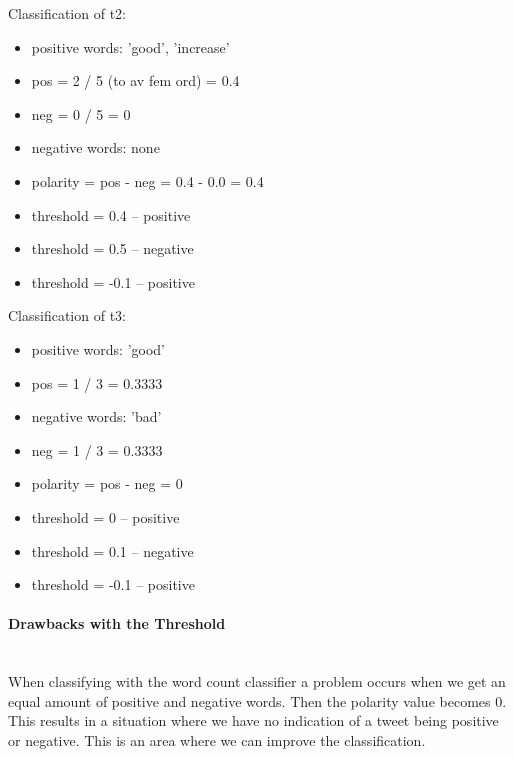 Classification of t2:
\begin{itemize}
	\item positive words: 'good', 'increase'
    \item pos = 2 / 5 (to av fem ord) = 0.4
    \item neg = 0 / 5 = 0
	\item negative words: none
    \item polarity = pos - neg = 0.4 - 0.0 = 0.4
    \item threshold = 0.4 -- positive
    \item threshold = 0.5 -- negative 
    \item threshold = -0.1 -- positive
\end{itemize}

Classification of t3:
\begin{itemize}
	\item positive words: 'good'
    \item pos = 1 / 3 = 0.3333
	\item negative words: 'bad'
    \item neg = 1 / 3 = 0.3333
    \item polarity = pos - neg = 0
    \item threshold = 0 -- positive
    \item threshold = 0.1 -- negative
    \item threshold = -0.1 -- positive
\end{itemize}

\paragraph{Drawbacks with the Threshold}
\hspace{0pt}\\
When classifying with the word count classifier a problem occurs when we
get an equal amount of positive and negative words. Then the polarity value
becomes 0. This results in a situation where we have no indication of a tweet
being positive or negative. This is an area where we can improve the
classification. 

